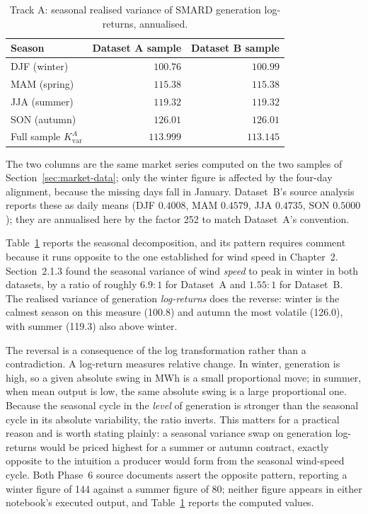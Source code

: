 \documentclass[11pt, a4paper, twoside]{article}
\begin{document}
\begin{table}[htbp]
\centering
\caption{Track A: seasonal realised variance of SMARD generation log-returns, annualised.}
\label{tab:tracka-seasonal}
\begin{tabular}{l r r}
\toprule
\textbf{Season} & \textbf{Dataset A sample} & \textbf{Dataset B sample} \\
\midrule
DJF (winter) & $100.76$ & $100.99$ \\
MAM (spring) & $115.38$ & $115.38$ \\
JJA (summer) & $119.32$ & $119.32$ \\
SON (autumn) & $126.01$ & $126.01$ \\
\midrule
Full sample $K_{\text{var}}^A$ & $113.999$ & $113.145$ \\
\bottomrule
\end{tabular}
\par\vspace{4pt}
\begin{minipage}{0.92\textwidth}
\footnotesize The two columns are the same market series computed on the two samples of Section~\ref{sec:market-data}; only the winter figure is affected by the four-day alignment, because the missing days fall in January. Dataset~B's source analysis reports these as daily means (DJF $0.4008$, MAM $0.4579$, JJA $0.4735$, SON $0.5000$); they are annualised here by the factor 252 to match Dataset~A's convention.
\end{minipage}
\end{table}

Table~\ref{tab:tracka-seasonal} reports the seasonal decomposition, and its pattern requires comment because it runs opposite to the one established for wind speed in Chapter~2. Section~2.1.3 found the seasonal variance of wind \emph{speed} to peak in winter in both datasets, by a ratio of roughly $6.9{:}1$ for Dataset~A and $1.55{:}1$ for Dataset~B. The realised variance of generation \emph{log-returns} does the reverse: winter is the calmest season on this measure (100.8) and autumn the most volatile (126.0), with summer (119.3) also above winter.

The reversal is a consequence of the log transformation rather than a contradiction. A log-return measures relative change. In winter, generation is high, so a given absolute swing in MWh is a small proportional move; in summer, when mean output is low, the same absolute swing is a large proportional one. Because the seasonal cycle in the \emph{level} of generation is stronger than the seasonal cycle in its absolute variability, the ratio inverts. This matters for a practical reason and is worth stating plainly: a seasonal variance swap on generation log-returns would be priced highest for a summer or autumn contract, exactly opposite to the intuition a producer would form from the seasonal wind-speed cycle. Both Phase~6 source documents assert the opposite pattern, reporting a winter figure of 144 against a summer figure of 80; neither figure appears in either notebook's executed output, and Table~\ref{tab:tracka-seasonal} reports the computed values.
\end{document}
